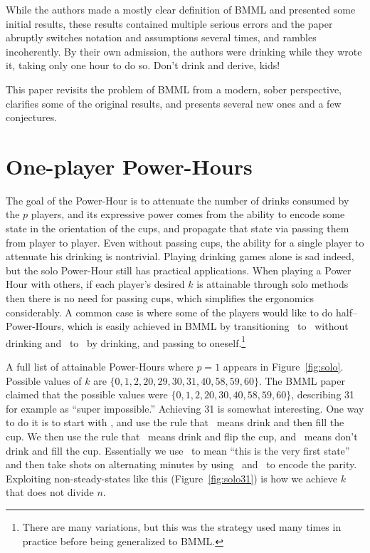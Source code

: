 \documentclass[twocolumn]{article}
\begin{document}
While the authors made a mostly clear definition of BMML and presented
some initial results, these results contained multiple serious errors
and the paper abruptly switches notation and assumptions several
times, and rambles incoherently. By their own admission, the authors
were drinking while they wrote it, taking only one hour to do so.
Don't drink and derive, kids!

This paper revisits the problem of BMML from a modern, sober
perspective, clarifies some of the original results, and presents
several new ones and a few conjectures.

\section{One-player \kn Power-Hours}

The goal of the \kn Power-Hour is to attenuate the number of drinks
consumed by the $p$ players, and its expressive power comes from the
ability to encode some state in the orientation of the cups, and
propagate that state via passing them from player to player. Even
without passing cups, the ability for a single player to attenuate his
drinking is nontrivial. Playing drinking games alone is sad indeed,
but the solo \kn Power-Hour still has practical applications. When
playing a Power Hour with others, if each player's desired $k$ is
attainable through solo methods then there is no need for passing
cups, which simplifies the ergonomics considerably. A common case is
where some of the players would like to do half--Power-Hours, which is
easily achieved in BMML by transitioning \emptycup\ to \fullcup\ without
drinking and \fullcup\ to \emptycup\ by drinking, and passing to
oneself.\!\footnote{There are many variations, but this was the
  strategy used many times in practice before being generalized to
  BMML.}

A full list of attainable \kn Power-Hours where $p=1$ appears in
Figure~\ref{fig:solo}. Possible values of $k$ are $\{ 0, 1, 2, 20, 29,
30, 31, 40, 58, 59, 60 \}$. The BMML paper claimed that the possible
values were $\{0, 1, 2, 20, 30, 40, 58, 59, 60 \}$, describing 31 for
example as ``super impossible.'' Achieving 31 is somewhat interesting.
One way to do it is to start with \emptycup, and use the rule that
\emptycup\ means drink and then fill the cup. We then use the rule
that \fullcup\ means drink and flip the cup, and \overcup\ means don't
drink and fill the cup. Essentially we use \emptycup\ to mean ``this
is the very first state'' and then take shots on alternating minutes
by using \overcup\ and \fullcup\ to encode the parity. Exploiting
non-steady-states like this (Figure~\ref{fig:solo31}) is how we
achieve $k$ that does not divide $n$.
\end{document}
